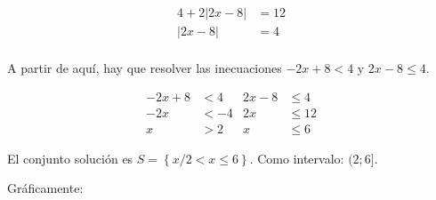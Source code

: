 \begin{align*}
	4+2|2x-8| &= 12\\
	|2x - 8| &= 4\\
\end{align*}

A partir de aquí, hay que resolver las inecuaciones $-2x + 8 < 4$ y $2x - 8 \le 4$.

\begin{align*}
	-2x+8 &< 4 & 2x - 8 & \le 4\\
	-2x &< -4 & 2x & \le 12\\
	x &> \boxed{2} &  x & \le \boxed{6}
\end{align*}

El conjunto solución es $S=\left\{ x / 2 < x \le 6 \right\}$.
Como intervalo: $(2;6]$.

Gráficamente:
\vspace{1cm}

\begin{center}
\end{center}
